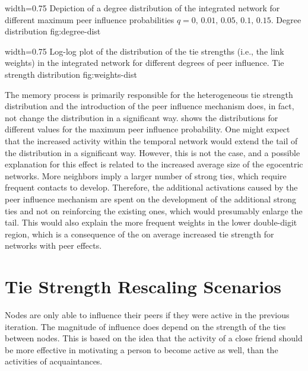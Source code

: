       {width=0.75\textwidth}
      {Depiction of a degree distribution of the integrated network for different maximum peer influence probabilities \( q = 0, \, 0.01, \, 0.05, \, 0.1, \, 0.15\).}
      {Degree distribution}
      {fig:degree-dist}


      {width=0.75\textwidth}
      {Log-log plot of the distribution of the tie strengths (i.e., the link weights) in the integrated network for different degrees of peer influence.}
      {Tie strength distribution}
      {fig:weights-dist}


The memory process is primarily responsible for the heterogeneous tie strength distribution and the introduction of the peer influence mechanism does, in fact, not change the distribution in a significant way.
 shows the distributions for different values for the maximum peer influence probability.
One might expect that the increased activity within the temporal network would extend the tail of the distribution in a significant way.
However, this is not the case, and a possible explanation for this effect is related to the increased average size of the egocentric networks.
More neighbors imply a larger number of strong ties, which require frequent contacts to develop.
Therefore, the additional activations caused by the peer influence mechanism are spent on the development of the additional strong ties and not on reinforcing the existing ones, which would presumably enlarge the tail.
This would also explain the more frequent weights in the lower double-digit region, which is a consequence of the on average increased tie strength for networks with peer effects.




\section{Tie Strength Rescaling Scenarios}
\label{sec:softmax-rescaling}

Nodes are only able to influence their peers if they were active in the previous iteration.
The magnitude of influence does depend on the strength of the ties between nodes.
This is based on the idea that the activity of a close friend should be more effective in motivating a person to become active as well, than the activities of acquaintances.

